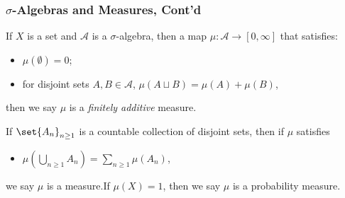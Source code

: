 \documentclass{beamer-custom}
\begin{document}
\begin{frame}
  \frametitle{$\sigma$-Algebras and Measures, Cont'd}
  If $X$ is a set and $\mathcal{A}$ is a $\sigma$-algebra, then a map $\mu\colon \mathcal{A}\rightarrow [0,\infty]$ that satisfies:
  \begin{itemize}
    \item $\mu\left( \emptyset \right) = 0$;
    \item for disjoint sets $A,B\in \mathcal{A}$, $\mu\left( A\sqcup B \right) = \mu\left( A \right) + \mu\left( B \right)$,
  \end{itemize}
  then we say $\mu$ is a \textit{finitely additive} measure.\pause \newline

  If $\set{A_n}_{n\geq 1}$ is a countable collection of disjoint sets, then if $\mu$ satisfies
  \begin{itemize}
    \item $\displaystyle \mu\left( \bigcup_{n\geq 1}A_n \right) = \sum_{n\geq 1}\mu\left( A_n \right)$,
  \end{itemize}
  we say $\mu$ is a measure.\pause\:If $\mu\left( X \right) = 1$, then we say $\mu$ is a probability measure.
\end{frame}
\end{document}
